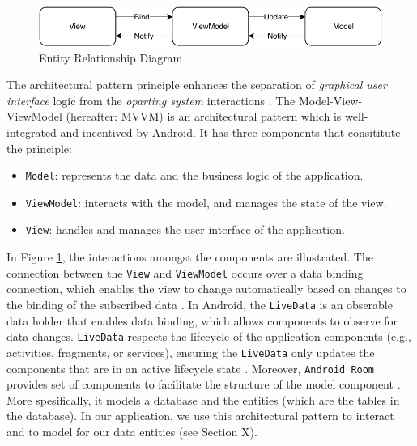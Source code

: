 
\begin{figure}
    \centering
    \includegraphics[scale=0.7]{images/MVVM.pdf}
    \caption{Entity Relationship Diagram}
    \label{fig:mvvm}
\end{figure}

The architectural pattern principle enhances the separation of \textit{graphical user interface} logic from the \textit{oparting system} interactions \cite{architecture}. The Model-View-ViewModel (hereafter: MVVM) is an architectural pattern which is well-integrated and incentived by Android. It has three components that consititute the principle:
\begin{itemize}
    \item \verb|Model|: represents the data and the business logic of the application. 
    \item \verb|ViewModel|: interacts with the model, and manages the state of the view.
    \item \verb|View|: handles and manages the user interface of the application.
\end{itemize}

In Figure \ref{fig:mvvm}, the interactions amongst the components are illustrated. The connection between the \verb|View| and \verb|ViewModel| occurs over a data binding connection, which enables the view to change automatically based on changes to the binding of the subscribed data \cite{mvvm}. In Android, the \verb|LiveData| is an obserable data holder that enables data binding, which allows components to observe for data changes. \verb|LiveData| respects the lifecycle of the application components (e.g., activities, fragments, or services), ensuring the \verb|LiveData| only updates the components that are in an active lifecycle state \cite{livedata}. Moreover, \verb|Android Room| provides set of components to facilitate the structure of the model component \cite{room}. More spesifically, it models a database and the entities (which are the tables in the database). In our application, we use this architectural pattern to interact and to model for our data entities (see Section X). 


